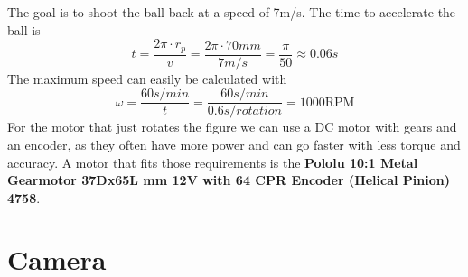 The goal is to shoot the ball back at a speed of 7m/s.
The time to accelerate the ball is
\begin{equation}
    \label{eq:time}
    t = \frac{2\pi\cdot r_p}{v} = \frac{2\pi\cdot 70mm}{7m/s} = \frac{\pi}{50} \approx 0.06s
\end{equation}
The maximum speed can easily be calculated with
\begin{equation}
    \label{eq:max_speed}
    \omega = \frac{60s/min}{t} = \frac{60s/min}{0.6s/rotation} = 1000\text{RPM}
\end{equation}
For the motor that just rotates the figure we can use a DC motor with gears and an encoder, as they often have more power and can go faster with less torque and accuracy.
A motor that fits those requirements is the \textbf{Pololu 10:1 Metal Gearmotor 37Dx65L mm 12V with 64 CPR Encoder (Helical Pinion) 4758}.


\section{Camera}\label{sec:camera}

